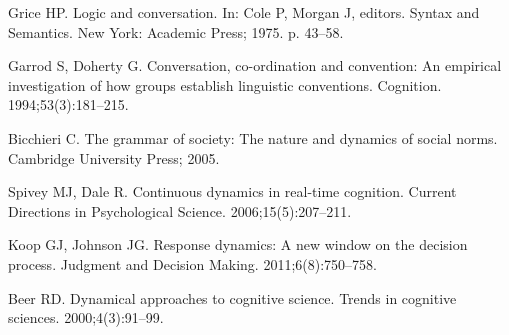 \documentclass[10pt,letterpaper]{article}
\begin{document}
\begin{thebibliography}{10}
Grice HP.
\newblock Logic and conversation.
\newblock In: Cole P, Morgan J, editors. Syntax and Semantics. New York:
  Academic Press; 1975. p. 43--58.

Garrod S, Doherty G.
\newblock Conversation, co-ordination and convention: An empirical
  investigation of how groups establish linguistic conventions.
\newblock Cognition. 1994;53(3):181--215.

Bicchieri C.
\newblock The grammar of society: The nature and dynamics of social norms.
\newblock Cambridge University Press; 2005.

Spivey MJ, Dale R.
\newblock Continuous dynamics in real-time cognition.
\newblock Current Directions in Psychological Science. 2006;15(5):207--211.

Koop GJ, Johnson JG.
\newblock Response dynamics: A new window on the decision process.
\newblock Judgment and Decision Making. 2011;6(8):750--758.

Beer RD.
\newblock Dynamical approaches to cognitive science.
\newblock Trends in cognitive sciences. 2000;4(3):91--99.

\end{thebibliography}


%
%
\end{document}
